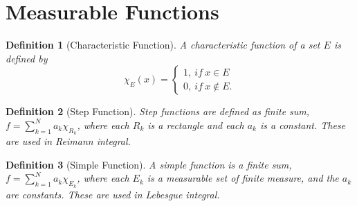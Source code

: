\documentclass{report}
\newtheorem{defn}{Definition}
\begin{document}
\section{Measurable Functions}
\begin{defn}[Characteristic Function]
	A characteristic function of a set $E$ is defined by 
	$$
	 \chi_E(x) = \begin{cases}
	1,\ if\ x \in E \\
	0,\ if\ x \notin E.
	\end{cases}
	$$
\end{defn}
\begin{defn}[Step Function]
	Step functions are defined as finite sum, $ f = \sum_{k=1}^{N} a_k \chi_{R_k} $, where each $R_k$ is a rectangle and each $a_k$ is a constant. These are used in Reimann integral.
\end{defn}
\begin{defn}[Simple Function]
	A simple function is a finite sum,  $ f = \sum_{k=1}^{N} a_k \chi_{E_k} $, where each $E_k$ is a measurable set of finite measure, and the $a_k$ are constants. These are used in Lebesgue integral.
\end{defn}
\end{document}
